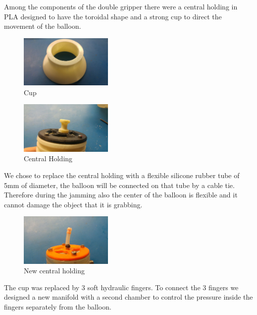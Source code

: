 \documentclass{article}
\begin{document}
Among the components of the double gripper there were a central holding in PLA designed to have the toroidal shape and a strong cup to direct the movement of the balloon.\\
\begin{figure}[h]
    \centering
    \includegraphics[width=0.4\textwidth]{Pictures/fingerOnToroidal/cup.jpg}
    \caption{Cup}
    \label{fig:cup}
\end{figure}

\begin{figure}[h]
    \centering
    \includegraphics[width=0.4\textwidth]{Pictures/fingerOnToroidal/centralHolding.jpg}
    \caption{Central Holding}
    \label{fig:centralHolding}
\end{figure}

We chose to replace the central holding with a flexible silicone rubber tube of 5mm of diameter, the balloon will be connected on that tube by a cable tie. Therefore during the jamming also the center of the balloon is flexible and it cannot damage the object that it is grabbing.

\begin{figure}[h]
    \centering
    \includegraphics[width=0.4\textwidth]{Pictures/fingerOnToroidal/NewCentralHolding.jpg}
    \caption{New central holding}
    \label{fig:newCentralHolding}
\end{figure}

The cup was replaced by 3 soft hydraulic fingers. To connect the 3 fingers we designed a new manifold with a second chamber to control the pressure inside the fingers separately from the balloon.
\end{document}
